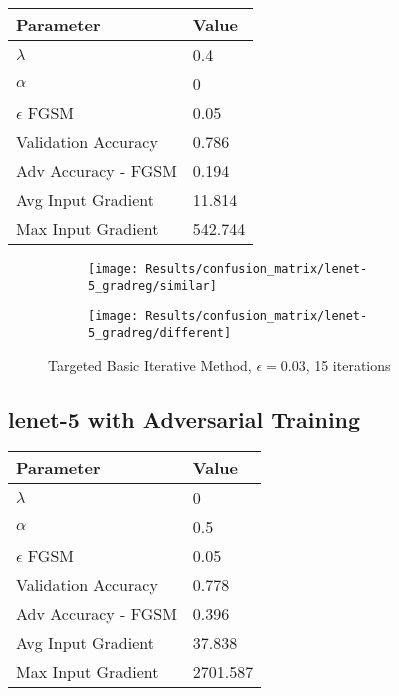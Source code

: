 \documentclass[draft,final]{vutinfth} %
\begin{document}
\begin{table}[h]
  \centering
  \begin{tabular}{ll}
    \toprule
			Parameter			& Value   					\\
    \midrule
			$\lambda$								& 0.4			\\
			$\alpha$								& 0				\\
			$\epsilon$ FGSM					& 0.05		\\
			
			Validation Accuracy			& 0.786		\\ 
			Adv Accuracy - FGSM			& 0.194		\\
			
			Avg Input Gradient			& 11.814	\\
			Max Input Gradient			& 542.744	\\
    \bottomrule
  \end{tabular}
\end{table}


\begin{figure}[h]
  \begin{subfigure}[b]{0.75\columnwidth}
		\centering
    \texttt{[image: Results/confusion\_matrix/lenet-5\_gradreg/similar]}
    \label{fig:exp:cm:lenet-5_gradreg:similar}
  \end{subfigure}
  \begin{subfigure}[b]{0.75\columnwidth}
		\centering
    \texttt{[image: Results/confusion\_matrix/lenet-5\_gradreg/different]}
    \label{fig:exp:cm:lenet-5_gradreg:different}
  \end{subfigure}
  \caption{Targeted Basic Iterative Method, $\epsilon = 0.03$, 15 iterations}
  \label{fig:exp:cm:lenet-5_gradreg}
\end{figure}

\subsection{lenet-5 with Adversarial Training}

\begin{table}[h]
  \centering
  \begin{tabular}{ll}
    \toprule
			Parameter			& Value   \\
    \midrule
			$\lambda$								& 0				\\
			$\alpha$								& 0.5			\\
			$\epsilon$ FGSM					& 0.05		\\
			
			Validation Accuracy			& 0.778		\\ 
			Adv Accuracy - FGSM			& 0.396		\\
			
			Avg Input Gradient			& 37.838	\\
			Max Input Gradient			& 2701.587\\
    \bottomrule
  \end{tabular}
\end{table}
\end{document}
